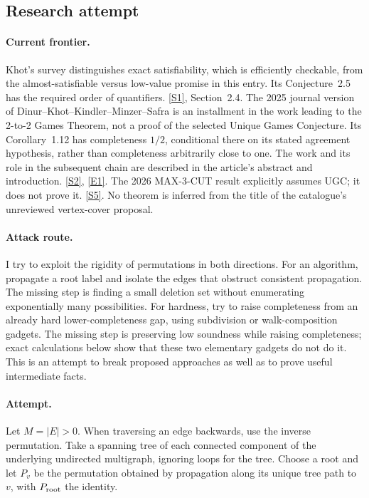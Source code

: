 \documentclass[11pt,a4paper]{article}
\newcommand{\sref}[2]{\hyperlink{source:#1:#2}{[S#2]}}
\newcommand{\eref}[2]{\hyperlink{extra:#1:#2}{[E#2]}}
\numberwithin{equation}{section}
\begin{document}
\subsection{Research attempt}

\paragraph{Current frontier.}
Khot's survey distinguishes exact satisfiability, which is efficiently
checkable, from the almost-satisfiable versus low-value promise in this
entry. Its Conjecture~2.5 has the required order of quantifiers.
\sref{29}{1}, Section~2.4. The 2025 journal version of
Dinur--Khot--Kindler--Minzer--Safra is an installment in the work leading
to the 2-to-2 Games Theorem, not a proof of the selected Unique Games
Conjecture. Its Corollary~1.12 has completeness $1/2$, conditional there
on its stated agreement hypothesis, rather than completeness arbitrarily
close to one. The work and its role in the subsequent chain are described
in the article's abstract and introduction. \sref{29}{2}, \eref{29}{1}.
The 2026 MAX-3-CUT result explicitly assumes UGC; it does not prove it.
\sref{29}{5}. No theorem is inferred from the title of the catalogue's
unreviewed vertex-cover proposal.

\paragraph{Attack route.}
I try to exploit the rigidity of permutations in both directions. For an
algorithm, propagate a root label and isolate the edges that obstruct
consistent propagation. The missing step is finding a small deletion set
without enumerating exponentially many possibilities. For hardness, try
to raise completeness from an already hard lower-completeness gap, using
subdivision or walk-composition gadgets. The missing step is preserving
low soundness while raising completeness; exact calculations below show
that these two elementary gadgets do not do it. This is an attempt to
break proposed approaches as well as to prove useful intermediate facts.

\paragraph{Attempt.}
Let $M=|E|>0$. When traversing an edge backwards, use the inverse
permutation. Take a spanning tree of each connected component of the
underlying undirected multigraph, ignoring loops for the tree. Choose a
root and let $P_v$ be the permutation obtained by propagation along its
unique tree path to $v$, with $P_{\rm root}$ the identity.
\end{document}
